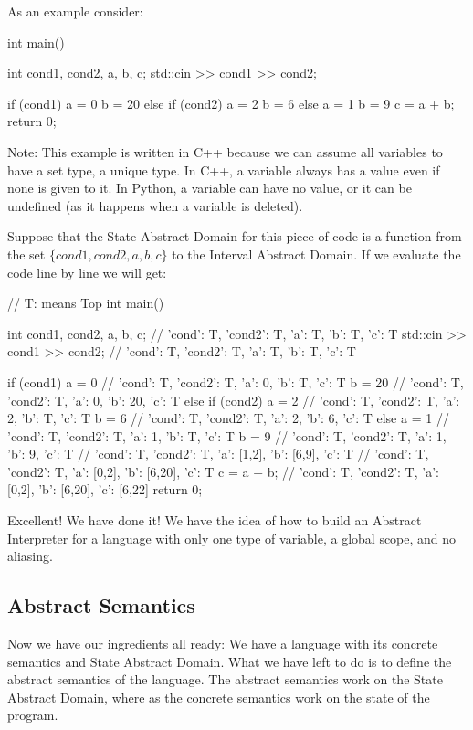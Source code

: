 As an example consider:

\begin{pythoncode}
int main() {
  int cond1, cond2, a, b, c;
  std::cin >> cond1 >> cond2;

  if (cond1) {
    a = 0
    b = 20
  } else if (cond2) {
    a = 2
    b = 6
  } else {
    a = 1
    b = 9
  }
  c = a + b;
  return 0;
}
\end{pythoncode}

Note: This example is written in C++ because we can assume all variables
to have a set type, a unique type. In C++, a variable always has a value
even if none is given to it. In Python, a variable can have no value, or
it can be undefined (as it happens when a variable is deleted).

Suppose that the State Abstract Domain for this piece of code is a
function from the set \(\{cond1, cond2, a, b, c\}\) to the Interval
Abstract Domain. If we evaluate the code line by line we will get:

\begin{pythoncode}
// T: means Top
int main() {
  int cond1, cond2, a, b, c;
  // {'cond': T, 'cond2': T, 'a': T, 'b': T, 'c': T}
  std::cin >> cond1 >> cond2;
  // {'cond': T, 'cond2': T, 'a': T, 'b': T, 'c': T}

  if (cond1) {
    a = 0
    // {'cond': T, 'cond2': T, 'a': 0, 'b': T, 'c': T}
    b = 20
    // {'cond': T, 'cond2': T, 'a': 0, 'b': 20, 'c': T}
  } else {
    if (cond2) {
      a = 2
      // {'cond': T, 'cond2': T, 'a': 2, 'b': T, 'c': T}
      b = 6
      // {'cond': T, 'cond2': T, 'a': 2, 'b': 6, 'c': T}
    } else {
      a = 1
      // {'cond': T, 'cond2': T, 'a': 1, 'b': T, 'c': T}
      b = 9
      // {'cond': T, 'cond2': T, 'a': 1, 'b': 9, 'c': T}
    }
    // {'cond': T, 'cond2': T, 'a': [1,2], 'b': [6,9], 'c': T}
  }
  // {'cond': T, 'cond2': T, 'a': [0,2], 'b': [6,20], 'c': T}
  c = a + b;
  // {'cond': T, 'cond2': T, 'a': [0,2], 'b': [6,20], 'c': [6,22]}
  return 0;
}
\end{pythoncode}

Excellent! We have done it! We have the idea of how to build an Abstract
Interpreter for a language with only one type of variable, a global
scope, and no aliasing.

\subsection{Abstract Semantics}\label{abstract-semantics}

Now we have our ingredients all ready: We have a language with its
concrete semantics and State Abstract Domain. What we have left to do is
to define the abstract semantics of the language. The abstract semantics
work on the State Abstract Domain, where as the concrete semantics work
on the state of the program.

